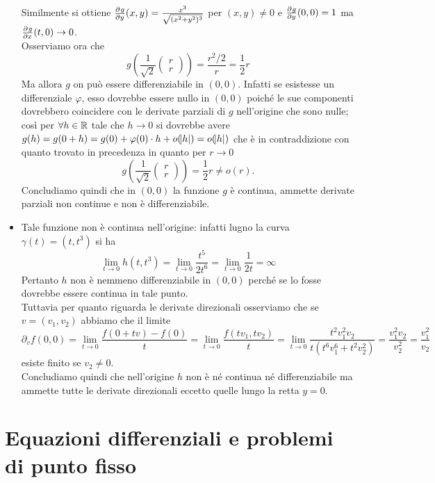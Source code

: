 \documentclass[a4paper]{article}\par \usepackage{style}\par
\begin{document}
\begin{itemize}
  Similmente si ottiene $ \pd{g}{y}(x, y) = \frac{x^3}{\sqrt{(x^2 + y^2)^3}} $ per $ (x, y) \neq 0 $ e $ \pd{g}{y}(0, 0) = 1 $ ma  $ \pd{g}{x}(t, 0) \to 0 $. \\
  Osserviamo ora che
  \begin{equation*}
    g\left(\frac{1}{\sqrt{2}} \begin{pmatrix} r \\ r \end{pmatrix}\right) = \frac{r^2/2}{r} = \frac{1}{2} r
  \end{equation*}
  Ma allora $ g $ on può essere differenziabile in $ (0, 0) $. Infatti se esistesse un differenziale $ \varphi $, esso dovrebbe essere nullo in $ (0, 0) $ poiché le sue componenti dovrebbero coincidere con le derivate parziali di $ g $ nell'origine che sono nulle; così per $ \forall h \in \mathbb{R} $ tale che $ h \to 0 $ si dovrebbe avere $ g(h) = g(0 + h) = g(0) + \varphi(0) \cdot h + o(\abs{h}) = o(\abs{h}) $ che è in contraddizione con quanto trovato in precedenza in quanto per $ r \to 0 $
  \begin{equation*}
    g\left(\frac{1}{\sqrt{2}} \begin{pmatrix} r \\ r \end{pmatrix}\right) = \frac{1}{2} r \neq o(r).
  \end{equation*}
  Concludiamo quindi che in $ (0, 0) $ la funzione $ g $ è continua, ammette derivate parziali non continue e non è differenziabile.
\item Tale funzione non è continua nell'origine: infatti lugno la curva $ \gamma(t) = (t, t^3) $ si ha
  \begin{equation*}
    \lim_{t \to 0} h(t, t^3) = \lim_{t \to 0} \frac{t^5}{2t^6} = \lim_{t \to 0} \frac{1}{2t} = \infty
  \end{equation*}
  Pertanto $ h $ non è nemmeno differenziabile in $ (0, 0) $ perché se lo fosse dovrebbe essere continua in tale punto. \\
  Tuttavia per quanto riguarda le derivate direzionali osserviamo che se $ v = (v_1, v_2) $ abbiamo che il limite
  \begin{equation*}
    \partial_v f(0, 0) = \lim_{t \to 0} \frac{f(0 + tv) - f(0)}{t} = \lim_{t \to 0} \frac{f(tv_1, tv_2)}{t} = \lim_{t \to 0} \frac{t^2 v_1^2 v_2}{t(t^6 v_1^6 + t^2 v_2^2)} = \frac{v_1^2 v_2}{v_2^2} = \frac{v_1^2}{v_2}
  \end{equation*}
  esiste finito se $ v_2 \neq 0 $. \\
  Concludiamo quindi che nell'origine $ h $ non è né continua né differenziabile ma ammette tutte le derivate direzionali eccetto quelle lungo la retta $ y = 0 $.
\end{itemize}\par \section{Equazioni differenziali e problemi di punto fisso}
\end{document}
